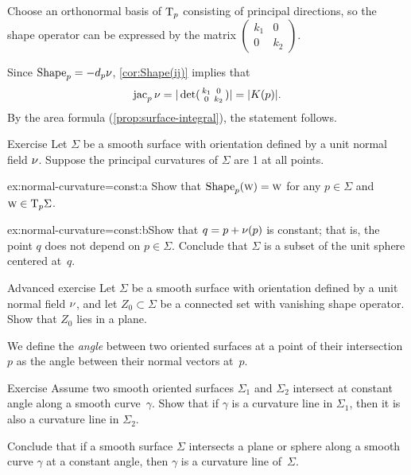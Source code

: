 Choose an orthonormal basis of $\mathrm{T}_p$ consisting of principal directions,
so the shape operator can be expressed by the matrix 
$(\begin{smallmatrix}
 k_1
 &0
 \\
 0
 &k_2
 \end{smallmatrix})$.

Since $\mathop{\rm Shape}\nolimits_p=-d_p\nu$, \ref{cor:Shape(ij)} implies that
\[\mathop{\rm jac}\nolimits_p\nu=|\det(\begin{smallmatrix}
 k_1
 &0
 \\
 0
 &k_2
 \end{smallmatrix})|=|K(p)|.\]
By the area formula (\ref{prop:surface-integral}), the statement follows.
\qeds


\begin{thm}{Exercise}\label{ex:normal-curvature=const}
Let $\Sigma$ be a smooth surface with orientation defined by a unit normal field $\nu$.
Suppose the principal curvatures of $\Sigma$ are 1 at all points.

\begin{subthm}{ex:normal-curvature=const:a} Show that $\mathop{\rm Shape}\nolimits_p(\text{\sc{w}})=\text{\sc{w}}$ for any $p\in\Sigma$ and $\text{\sc{w}}\in \mathrm{T}_p\Sigma$.
\end{subthm}

\begin{subthm}{ex:normal-curvature=const:b}Show that $q=p+\nu(p)$ is constant; that is, the point $q$ does not depend on $p\in\Sigma$.
Conclude that $\Sigma$ is a subset of the unit sphere centered at~$q$.
\end{subthm}

\end{thm}

\begin{thm}{Advanced exercise}\label{ex:normal-curvature=0}
Let $\Sigma$ be a smooth surface with orientation defined by a unit normal field $\nu$,
and let $Z_0\subset \Sigma$ be a connected set with vanishing shape operator.
Show that $Z_0$ lies in a plane.
\end{thm}


We define the {}\emph{angle} between two oriented surfaces at a point of their intersection $p$ as the angle between their normal vectors at~$p$.

\begin{thm}{Exercise}\label{ex:shape-curvature-line}
Assume two smooth oriented surfaces $\Sigma_1$ and $\Sigma_2$ intersect at constant angle along a smooth curve~$\gamma$.
Show that if $\gamma$ is a curvature line in $\Sigma_1$, then it is also a curvature line in $\Sigma_2$.

Conclude that if a smooth surface $\Sigma$ intersects a plane or sphere along a smooth curve $\gamma$ at a constant angle,
then $\gamma$ is a curvature line of~$\Sigma$.
\end{thm}

